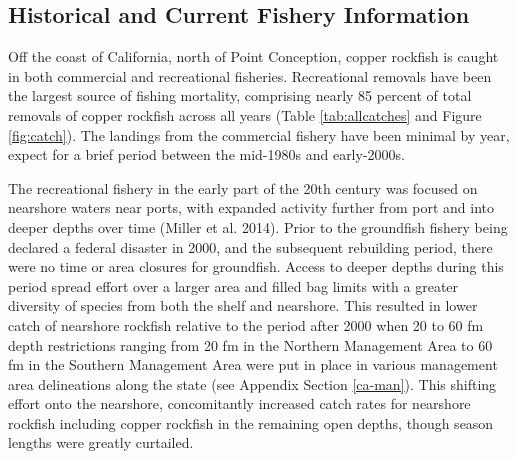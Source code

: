 \documentclass[11pt,
  english,
  a4paper,
]{article}
\begin{document}
\leavevmode\tagmcend\tagstructend\par


\hypertarget{historical-and-current-fishery-information}{%
\subsection{Historical and Current Fishery Information}\label{historical-and-current-fishery-information}}

\leavevmode\tagmcend\tagstructend


Off the coast of California, north of Point Conception, copper rockfish is caught in both commercial and recreational fisheries. Recreational removals have been the largest source of fishing mortality, comprising nearly 85 percent of total removals of copper rockfish across all years (Table \ref{tab:allcatches} and Figure \ref{fig:catch}). The landings from the commercial fishery have been minimal by year, expect for a brief period between the mid-1980s and early-2000s.

\leavevmode\tagmcend\tagstructend\par


The recreational fishery in the early part of the 20th century was focused on nearshore waters near ports, with expanded activity further from port and into deeper depths over time {(Miller et al. 2014)\leavevmode\tagmcend\tagstructend}. Prior to the groundfish fishery being declared a federal disaster in 2000, and the subsequent rebuilding period, there were no time or area closures for groundfish. Access to deeper depths during this period spread effort over a larger area and filled bag limits with a greater diversity of species from both the shelf and nearshore. This resulted in lower catch of nearshore rockfish relative to the period after 2000 when 20 to 60 fm depth restrictions ranging from 20 fm in the Northern Management Area to 60 fm in the Southern Management Area were put in place in various management area delineations along the state (see Appendix Section \ref{ca-man}). This shifting effort onto the nearshore, concomitantly increased catch rates for nearshore rockfish including copper rockfish in the remaining open depths, though season lengths were greatly curtailed.
\end{document}
